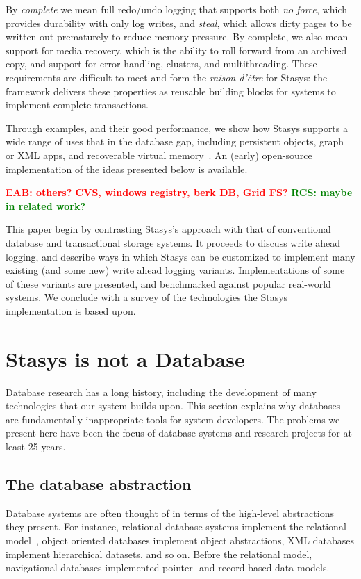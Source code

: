 \documentclass[letterpaper,twocolumn,10pt]{article}
\newcommand{\yad}{Stasys\xspace}
\newcommand{\eab}[1]{\textcolor{red}{\bf EAB: #1}}
\newcommand{\rcs}[1]{\textcolor{green}{\bf RCS: #1}}
\begin{document}
By {\em complete} we mean full redo/undo logging that supports
both {\em no force}, which provides durability with only log writes,
and {\em steal}, which allows dirty pages to be written out prematurely
to reduce memory pressure. By complete, we also
mean support for media recovery, which is the ability to roll
forward from an archived copy, and support for error-handling,
clusters, and multithreading. These requirements are difficult
to meet and form the {\em raison d'\^etre} for \yad{}: the framework
delivers these properties as reusable building blocks for systems
to implement complete transactions.

Through examples, and their good performance, we show how \yad{}
supports a wide range of uses that in the database gap, including
persistent objects, graph or XML apps, and recoverable
virtual memory~\cite{lrvm}.  An (early) open-source implementation of
the ideas presented below is available.

\eab{others?  CVS, windows registry, berk DB, Grid FS?}
\rcs{maybe in related work?}

This paper begin by contrasting \yad's approach with that of
conventional database and transactional storage systems.  It proceeds
to discuss write ahead logging, and describe ways in which \yad can be
customized to implement many existing (and some new) write ahead
logging variants.  Implementations of some of these variants are
presented, and benchmarked against popular real-world systems.  We
conclude with a survey of the technologies the \yad implementation is
based upon.

\section{\yad is not a Database}

Database research has a long history, including the development of
many technologies that our system builds upon.  This section explains
why databases are fundamentally inappropriate tools for system
developers.  The problems we present here have been the focus of
database systems and research projects for at least 25 years.

\subsection{The database abstraction}

Database systems are often thought of in terms of the high-level
abstractions they present.  For instance, relational database systems
implement the relational model~\cite{codd}, object oriented
databases implement object abstractions, XML databases implement
hierarchical datasets, and so on.  Before the relational model,
navigational databases implemented pointer- and record-based data models.
\end{document}
